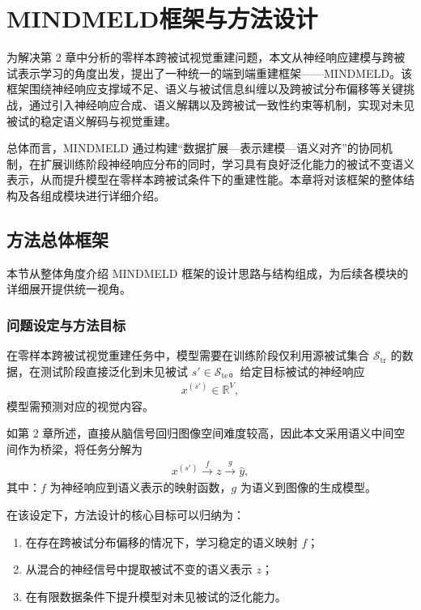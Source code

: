 \chapter{MINDMELD框架与方法设计}

为解决第 2 章中分析的零样本跨被试视觉重建问题，本文从神经响应建模与跨被试表示学习的角度出发，提出了一种统一的端到端重建框架——MINDMELD。该框架围绕神经响应支撑域不足、语义与被试信息纠缠以及跨被试分布偏移等关键挑战，通过引入神经响应合成、语义解耦以及跨被试一致性约束等机制，实现对未见被试的稳定语义解码与视觉重建。

总体而言，MINDMELD 通过构建“数据扩展—表示建模—语义对齐”的协同机制，在扩展训练阶段神经响应分布的同时，学习具有良好泛化能力的被试不变语义表示，从而提升模型在零样本跨被试条件下的重建性能。本章将对该框架的整体结构及各组成模块进行详细介绍。

\section{方法总体框架}

本节从整体角度介绍 MINDMELD 框架的设计思路与结构组成，为后续各模块的详细展开提供统一视角。

\subsection{问题设定与方法目标}

在零样本跨被试视觉重建任务中，模型需要在训练阶段仅利用源被试集合 $\mathcal{S}_{\mathrm{tr}}$ 的数据，在测试阶段直接泛化到未见被试 $s' \in \mathcal{S}_{\mathrm{te}}$。给定目标被试的神经响应
\begin{align}
  x^{(s')} \in \mathbb{R}^{V},
\end{align}
模型需预测对应的视觉内容。

如第 2 章所述，直接从脑信号回归图像空间难度较高，因此本文采用语义中间空间作为桥梁，将任务分解为
\begin{align}
  x^{(s')} \xrightarrow{\ f\ } z \xrightarrow{\ g\ } \hat{y},
\end{align}
其中：$f$ 为神经响应到语义表示的映射函数，$g$ 为语义到图像的生成模型。

在该设定下，方法设计的核心目标可以归纳为：
\begin{enumerate}
  \item 在存在跨被试分布偏移的情况下，学习稳定的语义映射 $f$；
  \item 从混合的神经信号中提取被试不变的语义表示 $z$；
  \item 在有限数据条件下提升模型对未见被试的泛化能力。
\end{enumerate}

